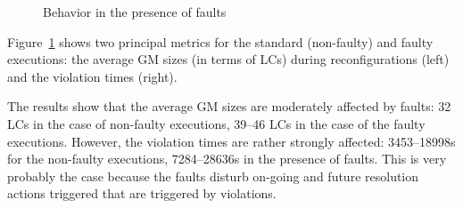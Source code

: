 %


%
\begin{figure}[htbp]
\vspace*{-.3cm}
\subcapcentertrue
{}
\caption{Behavior in the presence of faults}
\label{fig:snoozeFaults}
\vspace*{-.3cm}
\end{figure}


Figure~\ref{fig:snoozeFaults} shows two principal metrics for the
standard (non-faulty) and faulty executions: the average GM sizes (in
terms of LCs) during reconfigurations (left) and the violation times
(right).

The results show that the average GM sizes are moderately affected by
faults: 32 LCs in the case of non-faulty executions, 39--46 LCs in the
case of the faulty executions. However, the violation times are rather
strongly affected: 3453--18998s for the non-faulty executions,
7284--28636s in the presence of faults. This is very probably the case
because the faults disturb on-going and future resolution actions
triggered that are triggered by violations.



